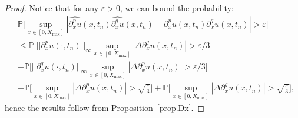 \documentclass[a4paper,11pt]{article}
\newtheorem{thm}{Theorem}[section]
\theoremstyle{definition}
\begin{document}
\begin{proof}
Notice that for any $\varepsilon>0$, we can bound the probability:
\begin{align*}
&\mathbb{P}\Big[\sup_{x\in[0,X_{\max}]}|\widehat{\partial_x^pu}(x,t_n)\widehat{\partial_x^qu}(x,t_n)-\partial_x^pu(x,t_n)\partial_x^qu(x,t_n)|>\varepsilon\Big] \\
&\leq\mathbb{P}\Big[||\partial_x^pu(\cdot,t_n)||_{\infty}\sup_{x\in[0,X_{\max}]}|\Delta\partial_x^qu(x,t_n)|>\varepsilon/3\Big] \\
&+ \mathbb{P}\Big[||\partial_x^qu(\cdot,t_n)||_{\infty}\sup_{x\in[0,X_{\max}]}|\Delta\partial_x^pu(x,t_n)|>\varepsilon/3\Big]\\
&+ \mathbb{P}\Big[\sup_{x\in[0,X_{\max}]}|\Delta\partial_x^pu(x,t_n)|>\sqrt{\frac{\varepsilon}{3}}\Big]+\mathbb{P}\Big[\sup_{x\in[0,X_{\max}]}|\Delta\partial_x^qu(x,t_n)|>\sqrt{\frac{\varepsilon}{3}}\Big],
\end{align*}
hence the results follow from Proposition~\ref{prop.Dx}.
\end{proof}
%
%
%
\end{document}

